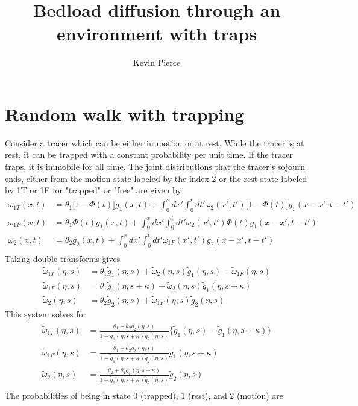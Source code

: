 \documentclass[11pt]{article}
\newcommand\om{\omega}
\newcommand\tom{\tilde{\omega}}
\newcommand\tg{\tilde{g}}
\begin{document}
\title{Bedload diffusion through an environment with traps}
\author{Kevin Pierce}
\maketitle

\section{Random walk with trapping}
Consider a tracer which can be either in motion or at rest.
While the tracer is at rest, it can be trapped with a constant probability per unit time. 
If the tracer traps, it is immobile for all time.
The joint distributions that the tracer's sojourn ends, either from the motion state labeled by the index 2 or the rest state labeled by 1T or 1F for "trapped" or "free" are given by
\begin{align}
\om_{1T}(x,t) &= \theta_1\big[1-\Phi(t)\big]g_1(x,t) + \int_0^x dx' \int_0^t dt' \om_2(x',t')\big[1-\Phi(t)\big]g_1(x-x',t-t')\\
\om_{1F}(x,t) &= \theta_1\Phi(t)g_1(x,t) + \int_0^x dx' \int_0^t dt' \om_2(x',t') \Phi(t) g_1(x-x',t-t')\\
\om_2(x,t) &= \theta_2 g_2(x,t) + \int_0^x dx' \int_0^t dt' \om_{1F}(x',t')g_2(x-x',t-t')\\
\end{align}
Taking double transforms gives
\begin{align}
\tom_{1T}(\eta,s) &= \theta_1 \tg_1(\eta,s) + \tom_2(\eta,s)\tg_1(\eta,s)-\tom_{1F}(\eta,s) \\
\tom_{1F}(\eta,s) &= \theta_1\tg_1(\eta,s+\kappa) + \tom_2(\eta,s)\tg_1(\eta,s+\kappa)\\
\tom_2(\eta,s) &= \theta_2 \tg_2(\eta,s) + \tom_{1F}(\eta,s)\tg_2(\eta,s)
\end{align}
This system solves for 
\begin{align}
\tom_{1T}(\eta,s) &= \frac{\theta_1 + \theta_2 \tg_2(\eta,s)}{1-\tg_1(\eta,s+\kappa)\tg_2(\eta,s)}\big\{\tg_1(\eta,s)-\tg_1(\eta,s+\kappa) \big\} \\
\tom_{1F}(\eta,s) &= \frac{\theta_1 + \theta_2 \tg_2(\eta,s)}{1-\tg_1(\eta,s+\kappa)\tg_2(\eta,s)}\tg_1(\eta,s+\kappa)\\
\tom_{2}(\eta,s) &= \frac{\theta_2 + \theta_1 \tg_1(\eta,s+\kappa)}{1-\tg_1(\eta,s+\kappa)\tg_2(\eta,s)}\tg_2(\eta,s)\\
\end{align}
The probabilities of being in state $0$ (trapped), $1$ (rest), and $2$ (motion) are
\end{document}
